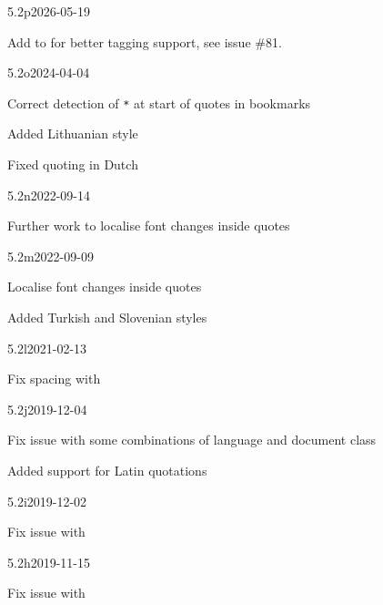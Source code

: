 \documentclass{ltxdockit}[2010/09/26]
\begin{document}
\begin{changelog}


\begin{release}{5.2p}{2026-05-19}
 \item Add  to  for better tagging support, see issue \#81.
\end{release}

\begin{release}{5.2o}{2024-04-04}
\item Correct detection of \texttt{*} at start of quotes in bookmarks
\item Added Lithuanian style
\item Fixed quoting in Dutch
\end{release}

\begin{release}{5.2n}{2022-09-14}
\item Further work to localise font changes inside quotes
\end{release}

\begin{release}{5.2m}{2022-09-09}
\item Localise font changes inside quotes
\item Added Turkish and Slovenian styles
\end{release}


\begin{release}{5.2l}{2021-02-13}
\item Fix spacing with 
\end{release}

\begin{release}{5.2j}{2019-12-04}
\item Fix issue with some combinations of language and document class
\item Added support for Latin quotations
\end{release}


\begin{release}{5.2i}{2019-12-02}
\item Fix issue with 
\end{release}

\begin{release}{5.2h}{2019-11-15}
\item Fix issue with 
\end{release}


\end{changelog}
\end{document}

